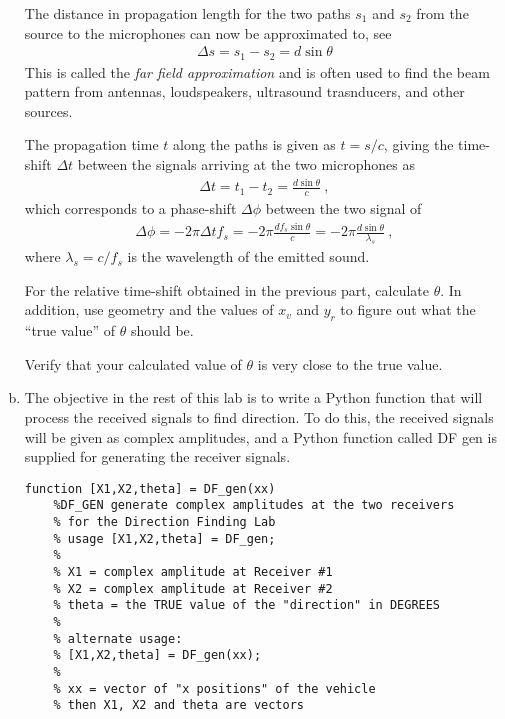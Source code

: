 \begin{enumerate}[a)]
	The distance in propagation length for the two paths $s_1$ and $s_2$ from the source to the microphones can now be approximated to, see 
	\begin{align}
		\Delta s = s_1-s_2 = d \sin\theta 
	\end{align}
	This is called the \emph{far field approximation} and is often used to find the beam pattern from antennas, loudspeakers, ultrasound trasnducers, and other sources.
	
	The propagation time $t$ along the paths is given as $t=s/c$, giving the time-shift $\Delta t$ between the signals arriving at the two microphones as
	\begin{align}
		\Delta t = t_1-t_2 = \frac{d \sin\theta }{c} \:,
	\end{align}
	which corresponds to a phase-shift $\Delta \phi$ between the two signal of
	\begin{align}
		\Delta \phi = -2\pi \Delta t f_s = -2 \pi \frac{d f_s \sin\theta }{c} 
		= -2 \pi \frac{d \sin\theta }{\lambda_s}\:,
	\end{align}
	where $\lambda_s=c/f_s$ is the wavelength of the emitted sound.
	
	For the relative time-shift obtained in the previous part, calculate $\theta$. In addition, use geometry and the values
	of $x_v$ and $y_r$ to figure out what the “true value” of $\theta$ should be. 
	
	Verify that your calculated value of $\theta$ is very close to the true value.
	
	\item The objective in the rest of this lab is to write a Python function that will process the received signals to find direction. 
	To do this, the received signals will be given as complex amplitudes, and a Python function called
	DF gen is supplied for generating the receiver signals.
	
	\begin{lstlisting}[style=pythonstyle]
	function [X1,X2,theta] = DF_gen(xx)
	%DF_GEN generate complex amplitudes at the two receivers
	% for the Direction Finding Lab
	% usage [X1,X2,theta] = DF_gen;
	%
	% X1 = complex amplitude at Receiver #1
	% X2 = complex amplitude at Receiver #2
	% theta = the TRUE value of the "direction" in DEGREES
	%
	% alternate usage:
	% [X1,X2,theta] = DF_gen(xx);
	%
	% xx = vector of "x positions" of the vehicle
	% then X1, X2 and theta are vectors
	
	\end{lstlisting}
	

\end{enumerate}
